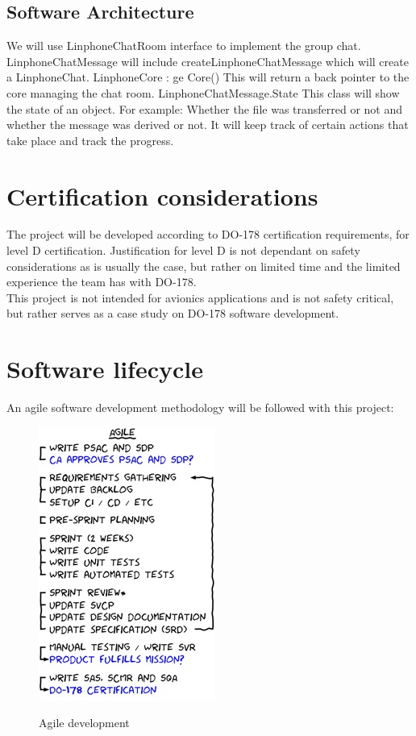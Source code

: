 \documentclass[a4paper]{article}
\begin{document}
\subsection{Software Architecture}

We will use LinphoneChatRoom interface to implement the group chat. LinphoneChatMessage will include createLinphoneChatMessage which will create a LinphoneChat. 
LinphoneCore : ge Core()  This will return a back pointer to the core managing the chat room.
LinphoneChatMessage.State
This class will show the state of an object. For example: Whether the file was transferred or not and whether the message was derived or not. It will keep track of certain actions that take place and track the progress.

\newpage


\section{Certification considerations}
The project will be developed according to DO-178 certification requirements, for level D certification. Justification for level D is not dependant on safety considerations as is usually the case, but rather on limited time and the limited experience the team has with DO-178.\\
This project is not intended for avionics applications and is not safety critical, but rather serves as a case study on DO-178 software development.\\
\newpage

\section{Software lifecycle}
An agile software development methodology will be followed with this project:\\

\begin{center}
\begin{figure}[H]
\includegraphics[width=0.5\linewidth]{./pictures/agile.jpg}\\
\caption{\label{fig:Agile}Agile development}
\end{figure}
\end{center}
\end{document}
